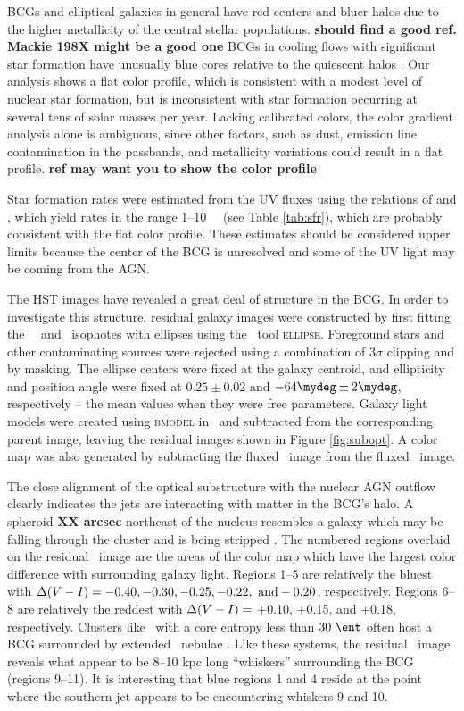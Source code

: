 \documentclass[11pt, preprint]{aastex}
\begin{document}
BCGs and elliptical galaxies in general have red centers and bluer
halos due to the higher metallicity of the central stellar
populations. {\bf should find a good ref. Mackie 198X might be a
  good one} BCGs in cooling flows with significant star formation have
unusually blue cores relative to the quiescent halos
\citep[\eg][]{rafferty06}. Our analysis shows a flat color profile,
which is consistent with a modest level of nuclear star formation, but
is inconsistent with star formation occurring at several tens of solar
masses per year. Lacking calibrated colors, the color gradient
analysis alone is ambiguous, since other factors, such as dust,
emission line contamination in the passbands, and metallicity
variations could result in a flat profile. {\bf ref may want you to
  show the color profile}

Star formation rates were estimated from the UV fluxes using the
relations of \citet{kennicutt2} and \citet{salim2007}, which yield
rates in the range 1--10 ~\msolpy\ (see Table \ref{tab:sfr}), which
are probably consistent with the flat color profile. These estimates
should be considered upper limits because the center of the BCG is
unresolved and some of the UV light may be coming from the AGN.

The HST images have revealed a great deal of structure in the BCG. In
order to investigate this structure, residual galaxy images were
constructed by first fitting the \hst\ \myv\ and \myi\ isophotes with
ellipses using the \iraf\ tool {\textsc{ellipse}}. Foreground stars
and other contaminating sources were rejected using a combination of
$3\sigma$ clipping and by masking. The ellipse centers were fixed at
the galaxy centroid, and ellipticity and position angle were fixed at
$0.25 \pm 0.02$ and $-64\mydeg \pm 2\mydeg$, respectively -- the mean
values when they were free parameters. Galaxy light models were
created using {\textsc{bmodel}} in \iraf\ and subtracted from the
corresponding parent image, leaving the residual images shown in
Figure \ref{fig:subopt}. A color map was also generated by subtracting
the fluxed \myi\ image from the fluxed \myv\ image.

The close alignment of the optical substructure with the nuclear AGN
outflow clearly indicates the jets are interacting with matter in the
BCG's halo. A spheroid {\bf XX arcsec} northeast of the nucleus
resembles a galaxy which may be falling through the cluster and is
being stripped \citep[see][for example]{2007ApJ...671..190S}. The
numbered regions overlaid on the residual \myv\ image are the areas of
the color map which have the largest color difference with surrounding
galaxy light. Regions 1--5 are relatively the bluest with
$\Delta(V-I) = -0.40, -0.30, -0.25, -0.22, ~\rm{and} -0.20$,
respectively. Regions 6--8 are relatively the reddest with
$\Delta(V-I) =$ +0.10, +0.15, and +0.18, respectively. Clusters
like \rbs\ with a core entropy less than $30 ~\ent$ often host a BCG
surrounded by extended \halpha\ nebulae
\citep[\eg][]{mcdonald10}. Like these systems, the residual
\myi\ image reveals what appear to be 8--10 kpc long ``whiskers''
surrounding the BCG (regions 9--11). It is interesting that blue
regions 1 and 4 reside at the point where the southern jet appears to
be encountering whiskers 9 and 10.
\end{document}
